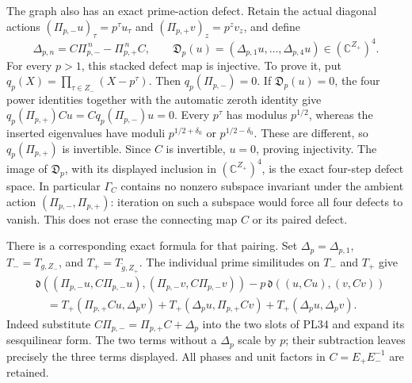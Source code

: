 \documentclass[11pt,a4paper]{article}
\theoremstyle{definition}\newtheorem{definition}[theorem]{Definition}
\newcommand{\C}{\mathbb C}\newcommand{\R}{\mathbb R}
\begin{document}
The graph also has an exact prime-action defect. Retain the actual
diagonal actions \((\Pi_{p,-}u)_\tau=p^\tau u_\tau\) and
\((\Pi_{p,+}v)_z=p^zv_z\), and define
\[
 \Delta_{p,n}=C\Pi_{p,-}^{\,n}-\Pi_{p,+}^{\,n}C,\qquad
 \mathfrak D_p(u)=(\Delta_{p,1}u,\ldots,\Delta_{p,4}u)
          \in(\C^{Z_+})^4 .
 \tag{PL51}\label{pl:pl:prime-graph-defect}
\]
For every \(p>1\), this stacked defect map is injective.
To prove it, put \(q_p(X)=\prod_{\tau\in Z_-}(X-p^\tau)\).
Then \(q_p(\Pi_{p,-})=0\). If \(\mathfrak D_p(u)=0\),
the four power identities together with the automatic zeroth
identity give
\(q_p(\Pi_{p,+})Cu=Cq_p(\Pi_{p,-})u=0\).
Every \(p^\tau\) has modulus \(p^{1/2}\), whereas the inserted
eigenvalues have moduli \(p^{1/2+\delta_0}\) or
\(p^{1/2-\delta_0}\). These are different, so
\(q_p(\Pi_{p,+})\) is invertible. Since \(C\) is invertible,
\(u=0\), proving injectivity.
The image of \(\mathfrak D_p\), with its displayed inclusion
in \((\C^{Z_+})^4\), is the exact four-step defect space.
In particular \(\Gamma_C\) contains no nonzero subspace invariant
under the ambient action \((\Pi_{p,-},\Pi_{p,+})\): iteration on
such a subspace would force all four defects to vanish.
This does not erase the connecting map \(C\) or its paired defect.

There is a corresponding exact formula for that pairing.
Set \(\Delta_p=\Delta_{p,1}\), \(T_-=T_{g,Z_-}\), and
\(T_+=T_{\widetilde g,Z_+}\). The individual prime similitudes
on \(T_-\) and \(T_+\) give
\[
 \begin{aligned}
 &\mathfrak d((\Pi_{p,-}u,C\Pi_{p,-}u),
             (\Pi_{p,-}v,C\Pi_{p,-}v))
              -p\,\mathfrak d((u,Cu),(v,Cv))\\
 &\quad=T_+(\Pi_{p,+}Cu,\Delta_pv)
        +T_+(\Delta_pu,\Pi_{p,+}Cv)
        +T_+(\Delta_pu,\Delta_pv).
 \end{aligned}
 \tag{PL52}\label{pl:pl:paired-prime-defect}
\]
Indeed substitute \(C\Pi_{p,-}=\Pi_{p,+}C+\Delta_p\) into
the two slots of PL34 and expand its sesquilinear form.
The two terms without a \(\Delta_p\) scale by \(p\); their
subtraction leaves precisely the three terms displayed.
All phases and unit factors in \(C=E_+E_-^{-1}\) are retained.
\end{document}

